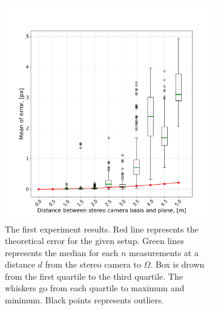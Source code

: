 \begin{figure}[ht]
  \begin{subfigure}[ht]{0.49\textwidth}
    \centering
    \includegraphics[width=\textwidth]{graphics/experiment_1_general.png}
    \caption[The first experiment results.]{The first experiment results. Red line represents the theoretical error for the given setup. Green lines represents the median for each $n$ measurements at a distance $d$ from the stereo camera to $\Omega$.
    Box is drown from the first quartile to the third quartile.
    The whiskers go from each quartile to maximum and minimum.
    Black points represents outliers.}
    \label{fig:exp_1_chart_dists}
  \end{subfigure}
  \hfill
  \begin{subfigure}[ht]{0.49\textwidth}
    \centering

\end{subfigure}
\end{figure}
